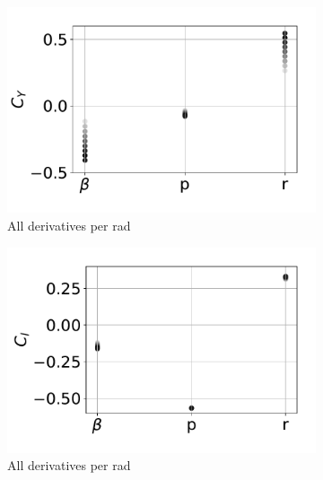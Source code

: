 \begin{figure}[hbt!]
	\centering
	\begin{subfigure}[b]{0.33\textwidth}
		\includegraphics[width=1.0\textwidth]{CyCstAR}
		\caption{All derivatives per rad}
		\label{fig:CyCstAR}
	\end{subfigure}
	\begin{subfigure}[b]{0.33\textwidth}
		\includegraphics[width=1.0\textwidth]{ClCstAR}
		\caption{All derivatives per rad}
		\label{fig:ClCstAR}
	\end{subfigure}
	\begin{subfigure}[b]{0.33\textwidth}

\end{subfigure}
\end{figure}

